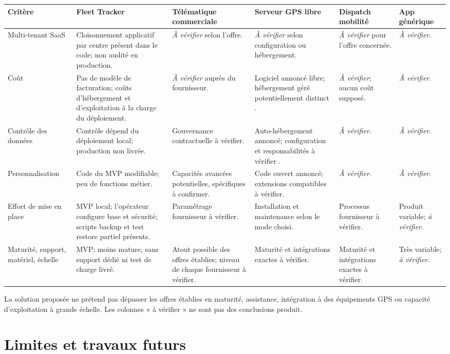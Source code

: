 \documentclass[12pt,a4paper]{article}
\begin{document}
\small
\begin{longtable}{p{2.4cm}p{2.25cm}p{2.25cm}p{2.25cm}p{2.25cm}p{2.25cm}}
\toprule
Critère & Fleet Tracker & Télématique commerciale & Serveur GPS libre & Dispatch mobilité & App générique\\
\midrule
\endhead
Multi-tenant SaaS & Cloison\-nement applicatif par centre présent dans le code; non audité en production. & \emph{À vérifier} selon l'offre. & \emph{À vérifier} selon configuration ou hébergement. & \emph{À vérifier} pour l'offre concernée. & \emph{À vérifier}.\\
Coût & Pas de modèle de facturation; coûts d'hébergement et d'exploitation à la charge du déploiement. & \emph{À vérifier} auprès du fournisseur. & Logiciel annoncé libre; hébergement géré potentiellement distinct \cite{traccar}. & \emph{À vérifier}; aucun coût supposé. & \emph{À vérifier}.\\
Contrôle des données & Contrôle dépend du déploiement local; production non livrée. & Gouvernance contractuelle à vérifier. & Auto-hébergement annoncé; configuration et responsabilités à vérifier \cite{traccar}. & \emph{À vérifier}. & \emph{À vérifier}.\\
Personnali\-sation & Code du MVP modifiable; peu de fonctions métier. & Capacités avancées potentielles, spécifiques à confirmer. & Code ouvert annoncé; extensions compatibles à vérifier. & \emph{À vérifier}. & \emph{À vérifier}.\\
Effort de mise en place & MVP local; l'opérateur configure base et sécurité; scripts backup et test restore partiel présents. & Paramétrage fournisseur à vérifier. & Installation et maintenance selon le mode choisi. & Processus fournisseur à vérifier. & Produit variable; \emph{à vérifier}.\\
Maturité, support, matériel, échelle & MVP; moins mature, sans support dédié ni test de charge livré. & Atout possible des offres établies; niveau de chaque fournisseur à vérifier. & Maturité et intégrations exactes à vérifier. & Maturité et intégrations exactes à vérifier. & Très variable; \emph{à vérifier}.\\
\bottomrule
\end{longtable}
\normalsize

La solution proposée ne prétend pas dépasser les offres établies en maturité, assistance, intégration à des équipements GPS ou capacité d'exploitation à grande échelle. Les colonnes « à vérifier » ne sont pas des conclusions produit.

\section{Limites et travaux futurs}
\end{document}
